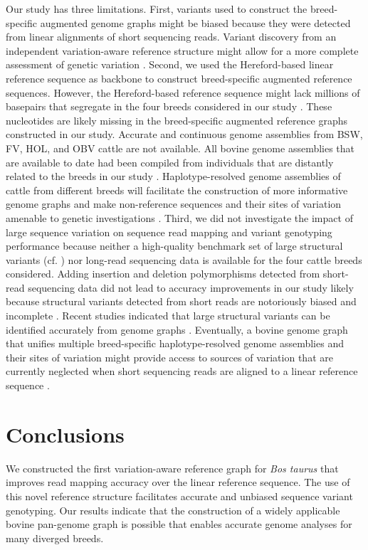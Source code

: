 \documentclass[../main.tex]{subfiles}
\begin{document}
Our study has three limitations. First, variants used to construct the breed-specific augmented genome graphs might be biased because they were detected from linear alignments of short sequencing reads. Variant discovery from an independent variation-aware reference structure might allow for a more complete assessment of genetic variation \citep{li2018synthetic}. Second, we used the Hereford-based linear reference sequence as backbone to construct breed-specific augmented reference sequences. However, the Hereford-based reference sequence might lack millions of basepairs that segregate in the four breeds considered in our study \citep{sherman2019assembly,hehir2016high,holden2018assembly,li2010building}. These nucleotides are likely missing in the breed-specific augmented reference graphs constructed in our study. Accurate and continuous genome assemblies from BSW, FV, HOL, and OBV cattle are not available. All bovine genome assemblies that are available to date had been compiled from individuals that are distantly related to the breeds in our study \citep{koren2018novo,rice2020continuous,rosen2020novo}. Haplotype-resolved genome assemblies of cattle from different breeds will facilitate the construction of more informative genome graphs and make non-reference sequences and their sites of variation amenable to genetic investigations \citep{koren2018novo,rice2020continuous}. Third, we did not investigate the impact of large sequence variation on sequence read mapping and variant genotyping performance because neither a high-quality benchmark set of large structural variants (cf. \citep{chaisson2019multi}) nor long-read sequencing data is available for the four cattle breeds considered. Adding insertion and deletion polymorphisms detected from short-read sequencing data did not lead to accuracy improvements in our study likely because structural variants detected from short reads are notoriously biased and incomplete \citep{alkan2011genome}. Recent studies indicated that large structural variants can be identified accurately from genome graphs \citep{hickey2020genotyping,eggertsson2019graphtyper2,chen2019paragraph,rakocevic2019fast}. Eventually, a bovine genome graph that unifies multiple breed-specific haplotype-resolved genome assemblies and their sites of variation might provide access to sources of variation that are currently neglected when short sequencing reads are aligned to a linear reference sequence \citep{duan2019hupan,beyter2020long,li2020design}.

\section{Conclusions}
We constructed the first variation-aware reference graph for \emph{Bos taurus} that improves read mapping accuracy over the linear reference sequence. The use of this novel reference structure facilitates accurate and unbiased sequence variant genotyping. Our results indicate that the construction of a widely applicable bovine pan-genome graph is possible that enables accurate genome analyses for many diverged breeds.
\end{document}
